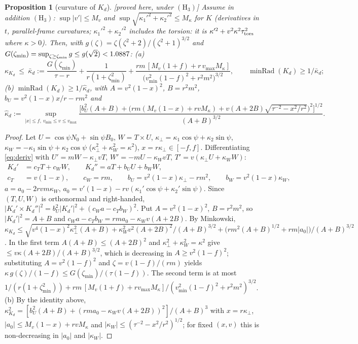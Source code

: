 \documentclass[10pt,a4paper]{article}
\theoremstyle{plain}
\newtheorem{proposition}[theorem]{Proposition}
\theoremstyle{definition}
\theoremstyle{remark}
\newcommand{\minRad}{\operatorname{minRad}}
\newcommand{\status}[1]{\textsf{\small [#1]}}
\begin{document}
\begin{proposition}[curvature of $K_d$]\label{prop:Hccurv}\status{proved here, under $(\mathrm H_3)$}
Assume in addition $(\mathrm H_3)$: $\sup|v'|\le M_v$ and $\sup\sqrt{\kappa_1'^2+\kappa_2'^2}\le M_\kappa$ for $K$ (derivatives in $t$, parallel-frame curvatures; $\kappa_1'^2+\kappa_2'^2$ includes the torsion: it is $\kappa'^2+v^2\kappa^2\tau_{\rm tors}^2$ where $\kappa>0$). Then, with $g(\zeta)=\zeta(\zeta^2+2)/(\zeta^2+1)^{3/2}$ and $G(\zeta_{\min})=\sup_{\zeta\ge\zeta_{\min}}g\le g(\sqrt2)<1.0887$: (a)
\begin{equation}\label{eq:Hckappa}
\kappa_{K_d}\ \le\ \bar\kappa_d:=\frac{G(\zeta_{\min})}{\tau-r}+\frac1{r(1+\zeta_{\min}^2)}
+\frac{rm\,[M_v(1+f)+r\,v_{\max}M_\kappa]}{\bigl(v_{\min}^2(1-f)^2+r^2m^2\bigr)^{3/2}},
\qquad \minRad(K_d)\ge1/\bar\kappa_d ;
\end{equation}
(b) $\minRad(K_d)\ge1/\hat\kappa_d$, with $A=v^2(1-x)^2$, $B=r^2m^2$, $b_U=v^2(1-x)x/r-rm^2$ and
\[
\hat\kappa_d:=\sup_{|x|\le f,\ v_{\min}\le v\le v_{\max}}\frac{\bigl[b_U^2(A+B)+\bigl(rm(M_v(1-x)+rvM_\kappa)+v(A+2B)\sqrt{\tau^{-2}-x^2/r^2}\bigr)^2\bigr]^{1/2}}{(A+B)^{3/2}} .
\]
\end{proposition}
\begin{proof}
Let $U=\cos\psi N_0+\sin\psi B_0$, $W=T\times U$, $\kappa_\perp=\kappa_1\cos\psi+\kappa_2\sin\psi$, $\kappa_W=-\kappa_1\sin\psi+\kappa_2\cos\psi$ ($\kappa_\perp^2+\kappa_W^2=\kappa^2$), $x=r\kappa_\perp\in[-f,f]$. Differentiating \eqref{eq:deriv} with $U'=mW-\kappa_\perp vT$, $W'=-mU-\kappa_WvT$, $T'=v(\kappa_\perp U+\kappa_WW)$:
\begin{align*}
K_d'&=c_TT+c_WW,\qquad K_d''=aT+b_UU+b_WW,\\
c_T&=v(1-x),\qquad c_W=rm,\qquad b_U=v^2(1-x)\kappa_\perp-rm^2,\qquad b_W=v^2(1-x)\kappa_W,
\end{align*}
$a=a_0-2rvm\kappa_W$, $a_0=v'(1-x)-rv(\kappa_1'\cos\psi+\kappa_2'\sin\psi)$. Since $(T,U,W)$ is orthonormal and right-handed, $|K_d'\times K_d''|^2=b_U^2|K_d'|^2+(c_Wa-c_Tb_W)^2$. Put $A=v^2(1-x)^2$, $B=r^2m^2$, so $|K_d'|^2=A+B$ and $c_Wa-c_Tb_W=rma_0-\kappa_Wv(A+2B)$. By Minkowski,
$\kappa_{K_d}\le\sqrt{v^4(1-x)^2\kappa_\perp^2(A+B)+\kappa_W^2v^2(A+2B)^2}/(A+B)^{3/2}
+\bigl(rm^2(A+B)^{1/2}+rm|a_0|\bigr)/(A+B)^{3/2}$. In the first term
$A(A+B)\le(A+2B)^2$ and $\kappa_\perp^2+\kappa_W^2=\kappa^2$ give $\le v\kappa(A+2B)/(A+B)^{3/2}$, which is decreasing in $A\ge v^2(1-f)^2$; substituting $A=v^2(1-f)^2$ and $\zeta=v(1-f)/(rm)$ yields $\kappa\,g(\zeta)/(1-f)\le G(\zeta_{\min})/(\tau(1-f))$. The second term is at most $1/(r(1+\zeta_{\min}^2))+rm\,[M_v(1+f)+rv_{\max}M_\kappa]/(v_{\min}^2(1-f)^2+r^2m^2)^{3/2}$. (b) By the identity above, $\kappa_{K_d}^2=[b_U^2(A+B)+(rma_0-\kappa_Wv(A+2B))^2]/(A+B)^3$ with $x=r\kappa_\perp$, $|a_0|\le M_v(1-x)+rvM_\kappa$ and $|\kappa_W|\le(\tau^{-2}-x^2/r^2)^{1/2}$; for fixed $(x,v)$ this is non-decreasing in $|a_0|$ and $|\kappa_W|$.
\end{proof}
\end{document}
